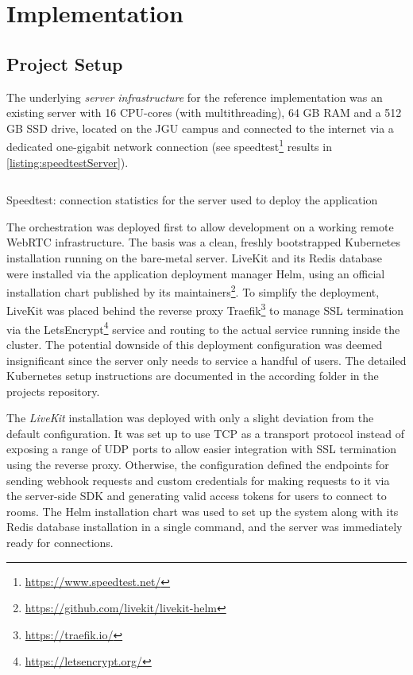 \chapter{Implementation}
\label{ch:implementation}

\section{Project Setup}
\label{sec:project-setup}

The underlying \emph{server infrastructure} for the reference implementation was an existing server with 16 \ac{CPU}-cores (with multithreading), 64 \ac{GB} \ac{RAM} and a 512 \ac{GB} \ac{SSD} drive, located on the \ac{JGU} campus and connected to the internet via a dedicated one-gigabit network connection (see speedtest\footnote{\url{https://www.speedtest.net/}} results in \autoref{listing:speedtestServer}).

\begin{listing}[!ht]
\inputminted{text}{04_Artefakte/03_Listings/speedtest-server.txt}
\caption{Speedtest: connection statistics for the server used to deploy the application\protect}
\label{listing:speedtestServer}
\end{listing}

The orchestration was deployed first to allow development on a working remote WebRTC infrastructure.
The basis was a clean, freshly bootstrapped Kubernetes installation running on the bare-metal server.
LiveKit and its Redis database were installed via the application deployment manager Helm, using an official installation chart published by its maintainers\footnote{\url{https://github.com/livekit/livekit-helm}}.
To simplify the deployment, LiveKit was placed behind the reverse proxy Traefik\footnote{\url{https://traefik.io/}} to manage \ac{SSL} termination via the LetsEncrypt\footnote{\url{https://letsencrypt.org/}} service and routing to the actual service running inside the cluster.
The potential downside of this deployment configuration was deemed insignificant since the server only needs to service a handful of users.
The detailed Kubernetes setup instructions are documented in the according folder in the project\textquotesingle s repository.

The \emph{LiveKit} installation was deployed with only a slight deviation from the default configuration.
It was set up to use \ac{TCP} as a transport protocol instead of exposing a range of UDP ports to allow easier integration with \ac{SSL} termination using the reverse proxy.
Otherwise, the configuration defined the endpoints for sending webhook requests and custom credentials for making requests to it via the server-side \ac{SDK} and generating valid access tokens for users to connect to rooms.
The Helm installation chart was used to set up the system along with its Redis database installation in a single command, and the server was immediately ready for connections.


